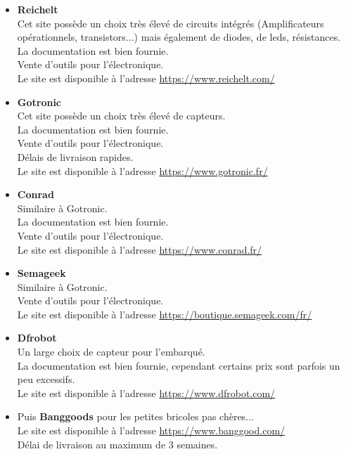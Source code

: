 \documentclass[12pt]{report}
\newcommand{\Circle}{$\circ$}
\newenvironment{items}[2]
{      
        \begin{itemize}[font=\color{#1}, label=#2]
           
    }
    { 
        \end{itemize}

}%
\renewcommand{\bold}[1]{\textbf{#1}}
\begin{document}
  \begin{items}{blue}{\Circle}
    \item \bold{Reichelt} \\ Cet site possède un choix très élevé de circuits intégrés (Amplificateurs opérationnels, transistors...) mais également de diodes, de leds, résistances.\\
    La documentation est bien fournie.\\
    Vente d'outils pour l'électronique.\\
    Le site est disponible à l'adresse \url{https://www.reichelt.com/}

    \item \bold{Gotronic} \\ Cet site possède un choix très élevé de capteurs.\\
    La documentation est bien fournie.\\
    Vente d'outils pour l'électronique.\\
    Délais de livraison rapides.\\
    Le site est disponible à l'adresse \url{https://www.gotronic.fr/}

    \item \bold{Conrad} \\ Similaire à Gotronic.\\
    La documentation est bien fournie.\\
    Vente d'outils pour l'électronique.\\
    Le site est disponible à l'adresse \url{https://www.conrad.fr/}

    \item \bold{Semageek} \\ Similaire à Gotronic.\\
    Vente d'outils pour l'électronique.\\
    Le site est disponible à l'adresse \url{https://boutique.semageek.com/fr/}


    \item \bold{Dfrobot} \\ Un large choix de capteur pour l'embarqué.\\
    La documentation est bien fournie, cependant certains prix sont parfois un peu excessifs.\\
    Le site est disponible à l'adresse \url{https://www.dfrobot.com/}

    \item Puis \bold{Banggoods} pour les petites bricoles pas chères... \\
    Le site est disponible à l'adresse \url{https://www.banggood.com/}\\
    Délai de livraison au maximum de 3 semaines.


\end{items}
\end{document}
